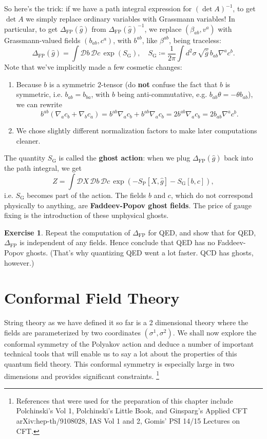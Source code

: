 \documentclass{report}
\theoremstyle{plain}
\theoremstyle{definition}
\newtheorem{exercise}{Exercise}[section]
\theoremstyle{remark}
\newcommand{\sg}{\sigma}
\newcommand{\cD}{\mathcal{D}}
\newcommand{\detFP}{\Delta_{\text{FP}}}
\begin{document}
So here's the trick: if we have a path integral expression for $(\det
A)^{-1}$, to get $\det A$ we simply replace ordinary variables with
Grassmann variables! In particular, to get $\detFP(\hat{g})$ from
$\detFP(\hat{g})^{-1}$, we replace $(\beta_{ab}, v^a)$ with
Grassmann-valued fields $(b_{ab}, c^a)$, with $b^{ab}$, like
$\beta^{ab}$, being traceless:
\[ \detFP(\hat{g}) = \int \cD b \, \cD c \, \exp(S_{\text{G}}), \quad S_{\text{G}} \coloneqq \frac{1}{2\pi} \int d^2\sigma \, \sqrt{\hat{g}} \, b_{ab} \nabla^a c^b. \]
Note that we've implicitly made a few cosmetic changes:
\begin{enumerate}
\item Because $b$ is a symmetric $2$-tensor (do {\bf not} confuse the
  fact that $b$ is symmetric, i.e. $b_{ab} = b_{ba}$, with $b$ being
  anti-commutative, e.g. $b_{ab}\theta = -\theta b_{ab}$), we can
  rewrite
  \[ b^{ab}(\nabla_a c_b + \nabla_b c_a) = b^{ab}\nabla_a c_b + b^{ab} \nabla_a c_b = 2b^{ab}\nabla_a c_b = 2b_{ab} \nabla^a c^b. \]
\item We chose slightly different normalization factors to make later
  computations cleaner.
\end{enumerate}
The quantity $S_{\text{G}}$ is called the {\bf ghost action}: when we
plug $\detFP(\hat{g})$ back into the path integral, we get
\[ Z = \int \cD X \, \cD b \, \cD c \, \exp(-S_{\text{P}}[X, \hat{g}] - S_{\text{G}}[b, c]), \]
i.e. $S_{\text{G}}$ becomes part of the action. The fields $b$ and
$c$, which do not correspond physically to anything, are {\bf
  Faddeev-Popov ghost fields}. The price of gauge fixing is the
introduction of these unphysical ghosts.

\begin{exercise}
  Repeat the computation of $\detFP$ for QED, and show that for QED,
  $\detFP$ is independent of any fields. Hence conclude that QED has
  no Faddeev-Popov ghosts. (That's why quantizing QED went a lot
  faster. QCD has ghosts, however.)
\end{exercise}

\chapter{Conformal Field Theory}
String theory as we have defined it so far is a 2 dimensional theory where
the fields are parameterized by two coordinates $(\sg^1,\sg^2)$. We shall
now explore the conformal symmetry of the Polyakov action and deduce a
number of important technical tools that will enable us to say a lot about
the properties of this quantum field theory. This conformal symmetry is
especially large in two dimensions and provides significant constraints.
\footnote{References that were used for the preparation of this chapter
include Polchinski's Vol 1, Polchinski's Little Book, and Ginsparg's
Applied CFT arXiv:hep-th/9108028, IAS Vol 1 and 2, Gomis' PSI 14/15
Lectures on CFT.}
\end{document}
